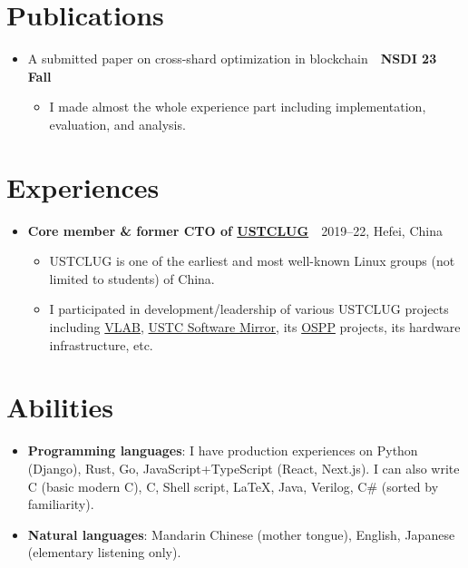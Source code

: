 \documentclass{article}
\newcommand{\Cpp}{C\nolinebreak[4]\hspace{-.05em}\raisebox{.4ex}{\tiny\bf ++}}
\newcommand{\Csharp}{C{\fontfaceLiberationSerif\#}}
\begin{document}
\section*{Publications}
\begin{itemize}[parsep=0.1cm,leftmargin=0.4cm]
  \item A submitted paper on cross-shard optimization in blockchain\ \dotfill\ \textbf{NSDI {\textquotesingle}23 Fall}
  \begin{itemize}[itemsep=0cm,parsep=0cm,topsep=0cm,leftmargin=0.25cm,label=]
    \item I made almost the whole experience part including implementation, evaluation, and analysis.
  \end{itemize}
\end{itemize}

\section*{Experiences}
\begin{itemize}[parsep=0.1cm,leftmargin=0.4cm]
  \item \textbf{Core member \& former CTO of \href{https://lug.ustc.edu.cn/}{USTCLUG}}\ \dotfill\ 2019--22, Hefei, China
    \begin{itemize}[itemsep=0cm,parsep=0cm,topsep=0cm,leftmargin=0.25cm,label=]
      \item USTCLUG is one of the earliest and most well-known Linux groups (not limited to students) of China.
      \item I participated in development/leadership of various USTCLUG projects including \href{https://vlab.ustc.edu.cn/}{VLAB}, \href{https://mirrors.ustc.edu.cn/}{USTC Software Mirror}, its \href{https://summer-ospp.ac.cn/}{OSPP} projects, its hardware infrastructure, etc.
    \end{itemize}
\end{itemize}

\section*{Abilities}
\begin{itemize}[parsep=0.1cm,leftmargin=0.4cm]
  \item \textbf{Programming languages}:
    I have production experiences on Python (Django), Rust, Go, JavaScript+TypeScript (React, Next.js).
    I can also write \Cpp{} (basic modern \Cpp), C, Shell script, \LaTeX, Java, Verilog, \Csharp{} (sorted by familiarity).
  \item \textbf{Natural languages}: Mandarin Chinese (mother tongue), English, Japanese (elementary listening only).
\end{itemize}

\blindtext[2]{}
\end{document}
